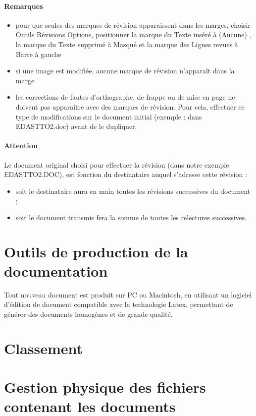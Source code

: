 \documentclass[a4paper]{article}
\begin{document}
\paragraph{Remarques}

\begin{itemize}
\item pour que seules des marques de révision apparaissent dans les marges, choisir Outils Révisions Options, positionner la marque du Texte inséré à (Aucune) , la marque du Texte supprimé à Masqué et la marque des Lignes revues à Barre à gauche
\item si une image est modifiée, aucune marque de révision n'apparaît dans la marge
\item les corrections de fautes d'orthographe, de frappe ou de mise en page ne doivent pas apparaître avec des marques de révision. Pour cela, effectuer ce type de modifications sur le document initial (exemple : dans EDASTTO2.doc) avant de le dupliquer.
\end{itemize}

\paragraph{Attention} Le document original choisi pour effectuer la révision (dans notre exemple EDASTTO2.DOC), est fonction du destinataire auquel s'adresse cette révision :

\begin{itemize}
\item soit le destinataire aura en main toutes les révisions successives du document ;
\item soit le document transmis fera la somme de toutes les relectures successives.
\end{itemize}


\section{Outils de production de la documentation}

Tout nouveau document est produit sur PC ou Macintosh, en utilisant un logiciel d'édition de document compatible avec la technologie Latex, permettant de générer des documents homogènes et de grande qualité.

\section{Classement}

\section{Gestion physique des fichiers contenant les documents}
\end{document}
